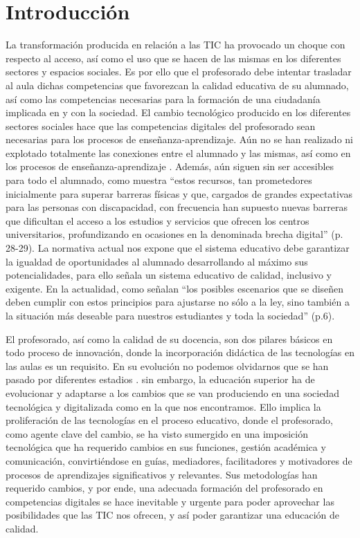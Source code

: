 \documentclass[spanish]{textolivre}
\begin{document}
\section{Introducción}\label{sec-intro}
La transformación producida en relación a las TIC ha provocado un choque con respecto al acceso, así como el uso que se hacen de las mismas en los diferentes sectores y espacios sociales. Es por ello que el profesorado debe intentar trasladar al aula dichas competencias que favorezcan la calidad educativa de su alumnado, así como las competencias necesarias para la formación de una ciudadanía implicada en y con la sociedad. El cambio tecnológico producido en los diferentes sectores sociales hace que las competencias digitales del profesorado sean necesarias para los procesos de enseñanza-aprendizaje. Aún no se han realizado ni explotado totalmente las conexiones entre el alumnado y las mismas, así como en los procesos de enseñanza-aprendizaje \cite{oecd2015}. Además, aún siguen sin ser accesibles para todo el alumnado, como muestra \textcite{albapastor2012} “estos recursos, tan prometedores inicialmente para superar barreras físicas y que, cargados de grandes expectativas para las personas con discapacidad, con frecuencia han supuesto nuevas barreras que dificultan el acceso a los estudios y servicios que ofrecen los centros universitarios, profundizando en ocasiones en la denominada brecha digital” (p. 28-29). La normativa actual nos expone que el sistema educativo debe garantizar la igualdad de oportunidades al alumnado desarrollando al máximo sus potencialidades, para ello señala un sistema educativo de calidad, inclusivo y exigente. En la actualidad, como señalan \textcite{trujillo2020} “los posibles escenarios que se diseñen deben cumplir con estos principios para ajustarse no sólo a la ley, sino también a la situación más deseable para nuestros estudiantes y toda la sociedad” (p.6). 

El profesorado, así como la calidad de su docencia, son dos pilares básicos en todo proceso de innovación, donde la incorporación didáctica de las tecnologías en las aulas es un requisito. En su evolución no podemos olvidarnos que  se  han  pasado  por  diferentes  estadios \cite{barroso2010, cabero2014, hernandez-ortega2021, usart2020}.  sin embargo, la educación superior  ha de evolucionar y adaptarse a los cambios que se van produciendo en una sociedad tecnológica y digitalizada como en la que nos encontramos. Ello implica la proliferación de las tecnologías en el proceso educativo, donde el profesorado, como agente clave del cambio, se ha visto sumergido en una imposición tecnológica que ha requerido cambios en sus funciones, gestión académica y comunicación, convirtiéndose en guías, mediadores, facilitadores y motivadores de procesos de aprendizajes significativos y relevantes. Sus metodologías han requerido cambios, y por ende, una adecuada formación del profesorado en competencias digitales se hace inevitable y urgente para poder aprovechar las posibilidades que las TIC nos ofrecen, y así poder garantizar una educación de calidad.
\end{document}
